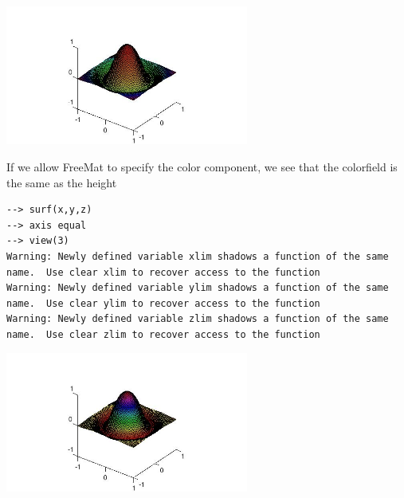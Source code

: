 \centerline{\includegraphics[width=8cm]{surf1}}

If we allow FreeMat to specify the color component, we see that
the colorfield is the same as the height
\begin{verbatim}
--> surf(x,y,z)
--> axis equal
--> view(3)
Warning: Newly defined variable xlim shadows a function of the same name.  Use clear xlim to recover access to the function
Warning: Newly defined variable ylim shadows a function of the same name.  Use clear ylim to recover access to the function
Warning: Newly defined variable zlim shadows a function of the same name.  Use clear zlim to recover access to the function
\end{verbatim}


\centerline{\includegraphics[width=8cm]{surf2}}

